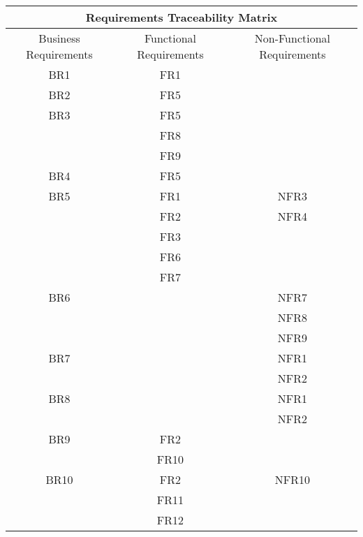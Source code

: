 \documentclass[a4paper,12pt]{article}
\begin{document}
\setlength{\tabcolsep}{10pt}
\renewcommand{\arraystretch}{1.5}
\begin{tabular}{ |c|c|c| }
 \hline
 \multicolumn{3}{|c|}{Requirements Traceability Matrix} \\
 \hline
 Business Requirements & Functional Requirements & Non-Functional Requirements\\
 \hline
 BR1 & FR1 & \\
 \hline
 BR2 & FR5 & \\
 \hline
 BR3 & FR5 & \\
     & FR8 & \\
     & FR9 & \\
\hline
 BR4 & FR5 & \\
 \hline
 BR5 & FR1 & NFR3\\
     & FR2 & NFR4\\
     & FR3 & \\
     & FR6 & \\
     & FR7 & \\
\hline
 BR6 &     & NFR7\\
     &     & NFR8\\
     &     & NFR9\\
\hline
 BR7 &     & NFR1\\
     &     & NFR2\\
\hline
 BR8 &     & NFR1\\
     &     & NFR2\\
\hline
 BR9 & FR2 & \\
      & FR10& \\
 \hline
 BR10 & FR2 & NFR10 \\
      & FR11& \\
      & FR12& \\
 \hline
\end{tabular}
\end{document}
